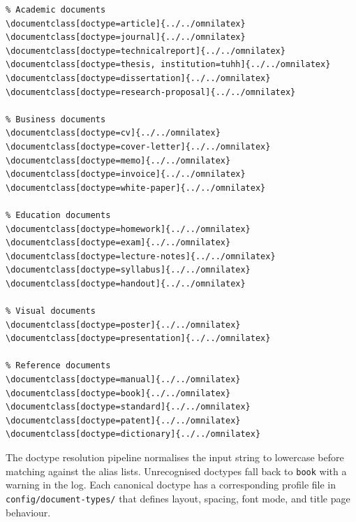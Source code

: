 \begin{verbatim}
% Academic documents
\documentclass[doctype=article]{../../omnilatex}
\documentclass[doctype=journal]{../../omnilatex}
\documentclass[doctype=technicalreport]{../../omnilatex}
\documentclass[doctype=thesis, institution=tuhh]{../../omnilatex}
\documentclass[doctype=dissertation]{../../omnilatex}
\documentclass[doctype=research-proposal]{../../omnilatex}

% Business documents
\documentclass[doctype=cv]{../../omnilatex}
\documentclass[doctype=cover-letter]{../../omnilatex}
\documentclass[doctype=memo]{../../omnilatex}
\documentclass[doctype=invoice]{../../omnilatex}
\documentclass[doctype=white-paper]{../../omnilatex}

% Education documents
\documentclass[doctype=homework]{../../omnilatex}
\documentclass[doctype=exam]{../../omnilatex}
\documentclass[doctype=lecture-notes]{../../omnilatex}
\documentclass[doctype=syllabus]{../../omnilatex}
\documentclass[doctype=handout]{../../omnilatex}

% Visual documents
\documentclass[doctype=poster]{../../omnilatex}
\documentclass[doctype=presentation]{../../omnilatex}

% Reference documents
\documentclass[doctype=manual]{../../omnilatex}
\documentclass[doctype=book]{../../omnilatex}
\documentclass[doctype=standard]{../../omnilatex}
\documentclass[doctype=patent]{../../omnilatex}
\documentclass[doctype=dictionary]{../../omnilatex}
\end{verbatim}

The doctype resolution pipeline normalises the input string to lowercase
before matching against the alias lists.  Unrecognised doctypes fall back
to \texttt{book} with a warning in the log.  Each canonical doctype has a
corresponding profile file in \texttt{config/document-types/} that defines
layout, spacing, font mode, and title page behaviour.
